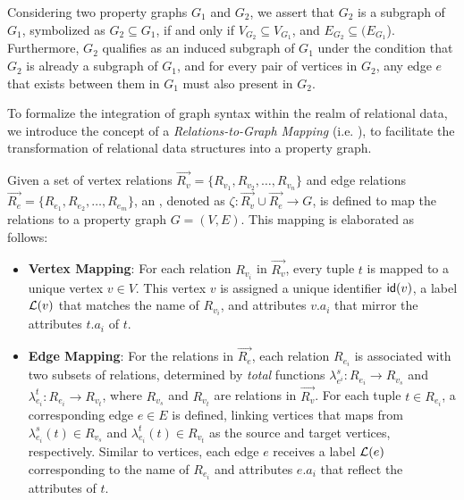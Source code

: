 Considering two property graphs \(G_1\) and \(G_2\), we assert that \(G_2\) is a subgraph of \(G_1\), symbolized as \(G_2 \subseteq G_1\), if and only if \(V_{G_2} \subseteq V_{G_1}\), and \(E_{G_2} \subseteq (E_{G_1}\)). Furthermore, \(G_2\) qualifies as an induced subgraph of \(G_1\) under the condition that \(G_2\) is already a subgraph of \(G_1\), and for every pair of vertices in \(G_2\), any edge \(e\) that exists between them in \(G_1\) must also present in \(G_2\).

To formalize the integration of graph syntax within the realm of relational data, we introduce the concept of a \textit{Relations-to-Graph Mapping} (i.e. \rgmapping), to facilitate the transformation of relational data structures into a property graph.

\begin{definition}[\rgmapping, $\zeta$]
\label{def:rgmapping}
Given a set of vertex relations \(\vec{R_v} = \{R_{v_1}, R_{v_2}, \ldots, R_{v_n}\}\) and edge relations \(\vec{R_e} = \{R_{e_1}, R_{e_2}, \ldots, R_{e_m}\}\), an \rgmapping, denoted as \(\zeta: \vec{R_v} \cup \vec{R_e} \to G\), is defined to map the relations to a property graph \(G = (V, E)\). This mapping is elaborated as follows:

\begin{itemize}
\item \textbf{Vertex Mapping}: For each relation \(R_{v_i}\) in \(\vec{R_v}\), every tuple \(t\) is mapped to a unique vertex \(v \in V\). This vertex \(v\) is assigned a unique identifier \({\mathsf{id}}(v)\), a label \(\mathcal{L}(v)\) that matches the name of \(R_{v_i}\), and attributes \(v.a_i\) that mirror the attributes \(t.a_i\) of \(t\).

\item \textbf{Edge Mapping}: For the relations in \(\vec{R_e}\), each relation \(R_{e_i}\) is associated with two subsets of relations, determined by \emph{total} functions \(\lambda_{e^i}^s: R_{e_i} \to R_{v_s}\) and \(\lambda_{e_i}^t: R_{e_i} \to R_{v_t}\), where \(R_{v_s}\) and \(R_{v_t}\) are relations in \(\vec{R_v}\). For each tuple \(t \in R_{e_i}\), a corresponding edge \(e \in E\) is defined, linking vertices that \rgmapping maps from \(\lambda_{e_i}^s(t) \in R_{v_s}\) and \(\lambda_{e_i}^t(t) \in R_{v_t}\) as the source and target vertices, respectively. Similar to vertices, each edge \(e\) receives a label \(\mathcal{L}(e)\) corresponding to the name of \(R_{e_i}\) and attributes \(e.a_i\) that reflect the attributes of \(t\).

\end{itemize}
\end{definition}

